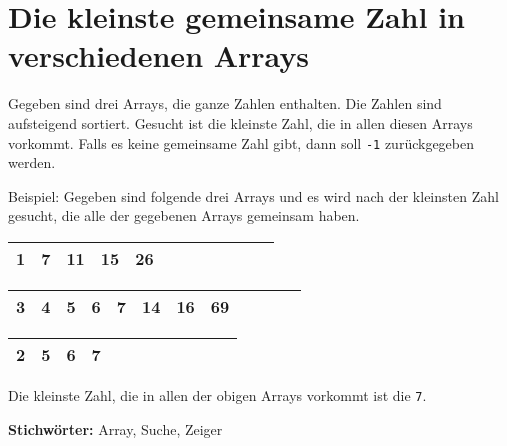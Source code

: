 \documentclass[babel]{book}
\begin{document}
\section{Die kleinste gemeinsame Zahl in verschiedenen Arrays}
\begin{examplei}
	Gegeben sind drei Arrays, die ganze Zahlen enthalten. Die Zahlen sind aufsteigend sortiert. Gesucht ist die kleinste Zahl, die in allen diesen Arrays vorkommt. Falls es keine gemeinsame Zahl gibt, dann soll \lstinline|-1| zurückgegeben werden.
	
	Beispiel:
	Gegeben sind folgende drei Arrays und es wird nach der kleinsten Zahl gesucht, die alle der gegebenen Arrays gemeinsam haben.
	

	\begin{tabular}{|l|l|l|l|l|l|l|l|l|l|l|l|} 
		\hline
		1 & \cellcolor{yellow!25}7 & 11 & 15 & 26 \\
		\hline
	\end{tabular}

	\begin{tabular}{|l|l|l|l|l|l|l|l|l|l|l|l|} 
		\hline
		3 & 4 & 5 & 6 & \cellcolor{yellow!25}7 & 14 & 16 & 69 \\
		\hline
	\end{tabular}

	\begin{tabular}{|l|l|l|l|l|l|l|l|l|l|l|l|} 
		\hline
		2 & 5 & 6 & \cellcolor{yellow!25}7 \\
		\hline
	\end{tabular}

	Die kleinste Zahl, die in allen der obigen Arrays vorkommt ist die \lstinline|7|.
	
\end{examplei}
{\bf Stichwörter:} Array, Suche, Zeiger
\end{document}
